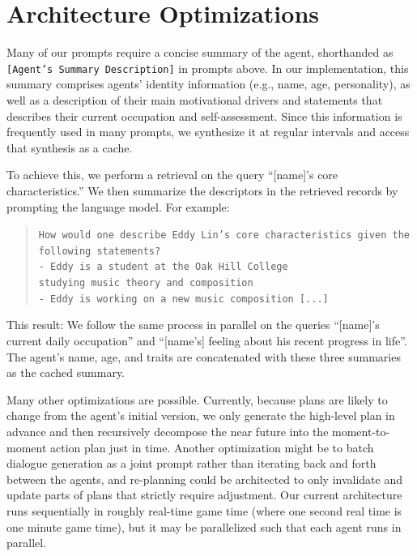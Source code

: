 \section{Architecture Optimizations}\label{sec:optimization}
Many of our prompts require a concise summary of the agent, shorthanded as \texttt{[Agent's Summary Description]} in prompts above. In our implementation, this summary comprises agents' identity information (e.g., name, age, personality), as well as a description of their main motivational drivers and statements that describes their current occupation and self-assessment. Since this information is frequently used in many prompts, we synthesize it at regular intervals and access that synthesis as a cache.

To achieve this, we perform a retrieval on the query “[name]’s core characteristics.” We then summarize the descriptors in the retrieved records by prompting the language model. For example: 
\begin{quote}
    {\small
    \texttt{How would one describe Eddy Lin’s core characteristics given the following statements? \\
    - Eddy is a student at the Oak Hill College \\studying music theory and composition\\
    - Eddy is working on a new music composition [...]}
    }
\end{quote}
This result:  We follow the same process in parallel on the queries “[name]’s current daily occupation” and “[name's] feeling about his recent progress in life”. The agent's name, age, and traits are concatenated with these three summaries as the cached summary.

Many other optimizations are possible. Currently, because plans are likely to change from the agent's initial version, we only generate the high-level plan in advance and then recursively decompose the near future into the moment-to-moment action plan just in time. Another optimization might be to batch dialogue generation as a joint prompt rather than iterating back and forth between the agents, and re-planning could be architected to only invalidate and update parts of plans that strictly require adjustment. Our current architecture runs sequentially in roughly real-time game time (where one second real time is one minute game time), but it may be parallelized such that each agent runs in parallel.

